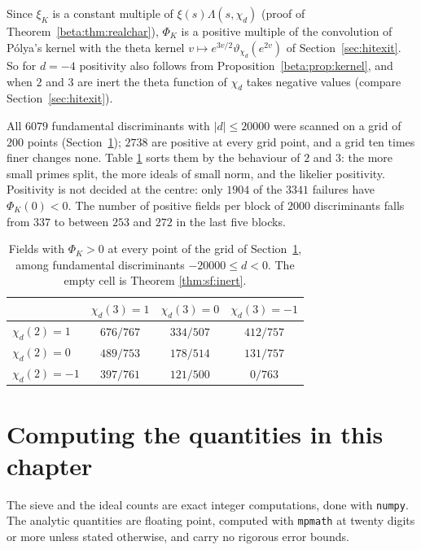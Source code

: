 Since $\xi_K$ is a constant multiple of $\xi(s)\Lambda(s,\chi_d)$ (proof of Theorem~\ref{beta:thm:realchar}), $\Phi_K$ is a positive multiple of the convolution of P\'olya's kernel with the theta kernel $v\mapsto e^{3v/2}\vartheta_{\chi_d}(e^{2v})$ of Section~\ref{sec:hitexit}. So for $d=-4$ positivity also follows from Proposition~\ref{beta:prop:kernel}, and when $2$ and $3$ are inert the theta function of $\chi_d$ takes negative values (compare Section~\ref{sec:hitexit}).

All $6079$ fundamental discriminants with $|d|\le20000$ were scanned on a grid of $200$ points (Section~\ref{sec:sf:computing}); $2738$ are positive at every grid point, and a grid ten times finer changes none. Table \ref{tab:sf:kernel} sorts them by the behaviour of $2$ and $3$: the more small primes split, the more ideals of small norm, and the likelier positivity. Positivity is not decided at the centre: only $1904$ of the $3341$ failures have $\Phi_K(0)<0$. The number of positive fields per block of $2000$ discriminants falls from $337$ to between $253$ and $272$ in the last five blocks.

\begin{table}[t]
\centering
\begin{tabular}{lccc}
\toprule
& $\chi_d(3)=1$ & $\chi_d(3)=0$ & $\chi_d(3)=-1$\\
\midrule
$\chi_d(2)=1$ & $676/767$ & $334/507$ & $412/757$\\
$\chi_d(2)=0$ & $489/753$ & $178/514$ & $131/757$\\
$\chi_d(2)=-1$ & $397/761$ & $121/500$ & $0/763$\\
\bottomrule
\end{tabular}
\caption{Fields with $\Phi_K>0$ at every point of the grid of Section~\ref{sec:sf:computing}, among fundamental discriminants $-20000\le d<0$. The empty cell is Theorem \ref{thm:sf:inert}.}
\label{tab:sf:kernel}
\end{table}

\section{Computing the quantities in this chapter}\label{sec:sf:computing}

The sieve and the ideal counts are exact integer computations, done with \texttt{numpy}. The analytic quantities are floating point, computed with \texttt{mpmath} at twenty digits or more unless stated otherwise, and carry no rigorous error bounds.

